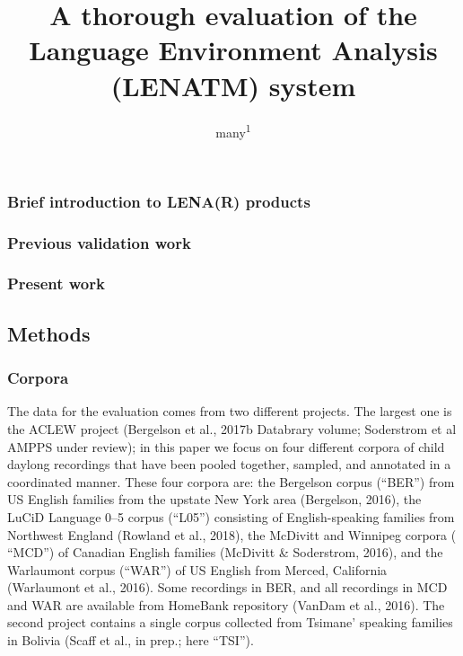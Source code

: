 \documentclass[english,floatsintext,man]{apa6}
\title{A thorough evaluation of the Language Environment Analysis (LENATM)
system}
\author{many\textsuperscript{1}}
\affiliation{
    \vspace{0.5cm}
          \textsuperscript{1}   }
\begin{document}
\maketitle

\setcounter{secnumdepth}{0}



\subsubsection{Brief introduction to LENA(R)
products}\label{brief-introduction-to-lenar-products}

\subsubsection{Previous validation work}\label{previous-validation-work}

\subsubsection{Present work}\label{present-work}

\subsection{Methods}\label{methods}

\subsubsection{Corpora}\label{corpora}

The data for the evaluation comes from two different projects. The
largest one is the ACLEW project (Bergelson et al., 2017b Databrary
volume; Soderstrom et al AMPPS under review); in this paper we focus on
four different corpora of child daylong recordings that have been pooled
together, sampled, and annotated in a coordinated manner. These four
corpora are: the Bergelson corpus (\enquote{BER}) from US English
families from the upstate New York area (Bergelson, 2016), the LuCiD
Language 0--5 corpus (\enquote{L05}) consisting of English-speaking
families from Northwest England (Rowland et al., 2018), the McDivitt and
Winnipeg corpora ( \enquote{MCD}) of Canadian English families (McDivitt
\& Soderstrom, 2016), and the Warlaumont corpus (\enquote{WAR}) of US
English from Merced, California (Warlaumont et al., 2016). Some
recordings in BER, and all recordings in MCD and WAR are available from
HomeBank repository (VanDam et al., 2016). The second project contains a
single corpus collected from Tsimane' speaking families in Bolivia
(Scaff et al., in prep.; here \enquote{TSI}).
\end{document}
